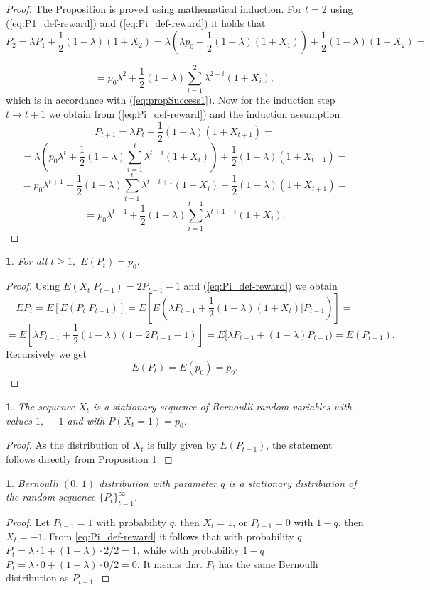 \documentclass{amsart}
\theoremstyle{definition}
\theoremstyle{plain}
\newtheorem{prop}[thm]{\protect\propositionname}
\theoremstyle{plain}
\theoremstyle{plain}
\numberwithin{equation}{section}
\providecommand{\propositionname}{Proposition}
\begin{document}
\begin{proof}
The Proposition is proved using mathematical induction. For $t=2$ using (\ref{eq:P1_def-reward})
and (\ref{eq:Pi_def-reward}) it holds that
\[
P_{2}=\lambda P_{1}+\frac{1}{2}(1-\lambda)(1+X_{2})=\lambda(\lambda p_{0}+\frac{1}{2}(1-\lambda)(1+X_{1}))+\frac{1}{2}(1-\lambda)(1+X_{2})=
\]

\[
=p_{0}\lambda^{2}+\frac{1}{2}(1-\lambda)\sum_{i=1}^{2}\lambda^{2-i}(1+X_{i}),
\]
which is in accordance with (\ref{eq:propSuccess1}). Now for the
induction step $t\rightarrow t+1$ we obtain from (\ref{eq:Pi_def-reward})
and the induction assumption
\[
P_{t+1}=\lambda P_{t}+\frac{1}{2}(1-\lambda)(1+X_{t+1})=
\]
\[
=\lambda(p_{0}\lambda^{t}+\frac{1}{2}(1-\lambda)\sum_{i=1}^{t}\lambda^{t-i}(1+X_{i}))+\frac{1}{2}(1-\lambda)(1+X_{t+1})=
\]
\[
=p_{0}\lambda^{t+1}+\frac{1}{2}(1-\lambda)\sum_{i=1}^{t}\lambda^{t-i+1}(1+X_{i})+\frac{1}{2}(1-\lambda)(1+X_{t+1})=
\]
\[
=p_{0}\lambda^{t+1}+\frac{1}{2}(1-\lambda)\sum_{i=1}^{t+1}\lambda^{t+1-i}(1+X_{i}).
\]
\end{proof}

\begin{prop}
\label{PropReward2}For all $t\geq1,$ $E(P_{t})=p_{0}.$
\end{prop}
\begin{proof}
Using $E(X_{t}|P_{t-1})=2P_{t-1}-1$ and (\ref{eq:Pi_def-reward})
we obtain
\[
EP_{t}=E[E(P_{t}|P_{t-1})]=E[E(\lambda P_{t-1}+\frac{1}{2}(1-\lambda)(1+X_{t})|P_{t-1})]=
\]
\[
=E[\lambda P_{t-1}+\frac{1}{2}(1-\lambda)(1+2P_{t-1}-1)]=E[\lambda P_{t-1}+(1-\lambda)P_{t-1})=  E(P_{t-1}).
\]
Recursively we get
\begin{equation}
E(P_{t})=E(p_{0})=p_{0}.\label{eq:EPt-reward-formula}
\end{equation}
\end{proof}

\begin{prop}
The sequence $X_t$ is a stationary sequence of Bernoulli random
variables with values $1,\,-1$ and with $P(X_t=1)=p_0$.
\end{prop}
\begin{proof}
As the distribution of $X_t$ is fully given by $E(P_{t-1})$, the
statement follows directly from Proposition \ref{PropReward2}.
\end{proof}

\begin{prop}
Bernoulli $(0,\,1)$ distribution with parameter $q$ is  {\color{red}a} stationary distribution of the random sequence
${\{P_{t}\}}_{t=1}^{\infty}$.
\end{prop}
\begin{proof}
Let $P_{t-1}=1$ with probability $q$, then $X_t=1$, or
$P_{t-1}=0$ with $1-q$, then $X_t=-1$.  From \eqref{eq:Pi_def-reward} it follows that with probability
$q$ $P_t=\lambda\cdot 1+(1-\lambda)\cdot 2/2=1$, while with
probability $1-q$ $P_t=\lambda\cdot 0+(1-\lambda)\cdot 0/2=0$.
It means that $P_t$ has the same Bernoulli distribution as
$P_{t-1}$.
\end{proof}
\end{document}
